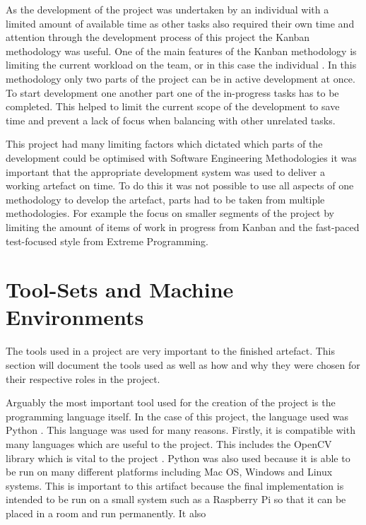 \documentclass[11pt,a4paper]{report}
\begin{document}
As the development of the project was undertaken by an individual with a limited amount of available time as other tasks also required their own time and attention through the development process of this project the Kanban methodology was useful. One of the main features of the Kanban methodology is limiting the current workload on the team, or in this case the individual \citep{Kanban_lei2017statistical}. In this methodology only two parts of the project can be in active development at once. To start development one another part one of the in-progress tasks has to be completed. This helped to limit the current scope of the development to save time and prevent a lack of focus when balancing with other unrelated tasks.

This project had many limiting factors which dictated which parts of the development could be optimised with Software Engineering Methodologies it was important that the appropriate development system was used to deliver a working artefact on time. To do this it was not possible to use all aspects of one methodology to develop the artefact, parts had to be taken from multiple methodologies. For example the focus on smaller segments of the project by limiting the amount of items of work in progress from Kanban and the fast-paced test-focused style from Extreme Programming.

\section{Tool-Sets and Machine Environments}

The tools used in a project are very important to the finished artefact. This section will document the tools used as well as how and why they were chosen for their respective roles in the project.

Arguably the most important tool used for the creation of the project is the programming language itself. In the case of this project, the language used was Python \citep{Python}. This language was used for many reasons. Firstly, it is compatible with many languages which are useful to the project. This includes the OpenCV library which is vital to the project \citep{OpenCV}. Python was also used because it is able to be run on many different platforms including Mac OS, Windows and Linux systems. This is important to this artifact because the final implementation is intended to be run on a small system such as a Raspberry Pi so that it can be placed in a room and run permanently. It also  
\end{document}
